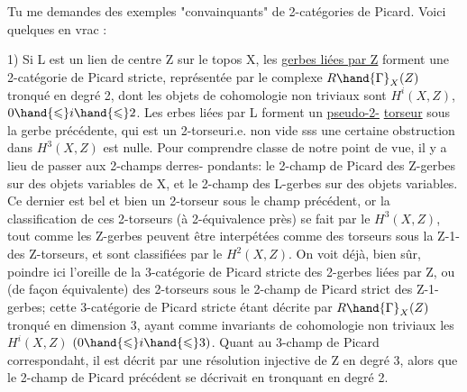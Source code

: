 
Tu me demandes des exemples "convainquants" de 2-catégories de Picard.
Voici quelques  en vrac :

 1) Si L est un lien de centre Z sur le topos X, les \uline{gerbes liées par Z}
forment une 2-catégorie de Picard stricte, représentée par le complexe
$R\hand{\Gamma}_X(Z)$ tronqué en degré 2, dont les objets de cohomologie non triviaux
sont  $H^i(X,Z)$, $0 \hand{\leqslant} i \hand{\leqslant} 2$. Les erbes liées par L forment un \uline{pseudo-2-}
\uline{torseur} sous la gerbe précédente, qui est un 2-torseur\hand{(}i.e. non vide\hand{)} sss
une certaine obstruction dans $H^3(X,Z)$ est nulle. Pour comprendre 
classe de notre point de vue, il y a lieu de passer aux 2-champs derres-%
pondants: le 2-champ de Picard  des Z-gerbes
sur des objets variables de X, et le 2-champ des L-gerbes sur des objets
variables. Ce dernier est bel et bien un 2-torseur sous le champ précédent,
or la classification de ces  2-torseurs (à 2-équivalence près) se
fait par le $H^3(X,Z)$,  \hand{(}tout comme les Z-gerbes peuvent être
interpétées comme des torseurs sous la Z-1-  des Z-torseurs, et sont
 classifiées par le $H^2(X,Z)$\hand{)}. On voit déjà, bien sûr, poindre
ici l'oreille de la 3-catégorie de Picard stricte des 2-gerbes liées par Z,
ou (de façon équivalente) des 2-torseurs sous le 2-champ de Picard strict
des Z-1-gerbes; cette 3-catégorie de Picard stricte étant décrite par
$R\hand{\Gamma}_X(Z)$ tronqué en dimension 3, ayant comme invariants de cohomologie non
triviaux les $H^i(X,Z)$ $(0 \hand{\leqslant} i \hand{\leqslant} 3)$. Quant au 3-champ de Picard correspondaht,
il est décrit par une résolution injective de Z  en degré 3, alors
que le  2-champ de Picard précédent se décrivait en tronquant en degré 2.

